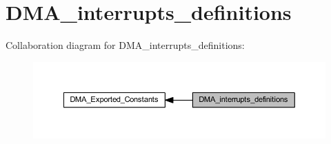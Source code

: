 \hypertarget{group___d_m_a__interrupts__definitions}{}\section{D\+M\+A\+\_\+interrupts\+\_\+definitions}
\label{group___d_m_a__interrupts__definitions}
Collaboration diagram for D\+M\+A\+\_\+interrupts\+\_\+definitions\+:\nopagebreak
\begin{figure}[H]
\begin{center}
\leavevmode
\includegraphics[width=350pt]{group___d_m_a__interrupts__definitions}
\end{center}
\end{figure}
